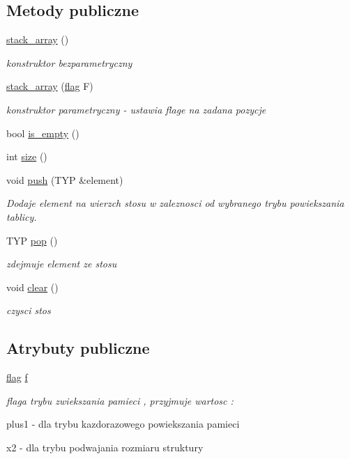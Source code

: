 \subsection*{\-Metody publiczne}
\begin{DoxyCompactItemize}
\item 
\hyperlink{classstack__array_a430ec07ba59152bdb618039ae5f74482}{stack\-\_\-array} ()
\begin{DoxyCompactList}\small\item\em konstruktor bezparametryczny \end{DoxyCompactList}\item 
\hyperlink{classstack__array_ad6ac30696a594fc1f4b58cc94facad9f}{stack\-\_\-array} (\hyperlink{stos_8hh_a7847560c748814fd3070e9149a9578bd}{flag} \-F)
\begin{DoxyCompactList}\small\item\em konstruktor parametryczny -\/ ustawia flage na zadana pozycje \end{DoxyCompactList}\item 
bool \hyperlink{classstack__array_a653b67eb0566e9481e3525dd2f2bc519}{is\-\_\-empty} ()
\item 
int \hyperlink{classstack__array_a26ee4c653f299d3fe03b443f6180d745}{size} ()
\item 
void \hyperlink{classstack__array_a2f48529c5e88d82f5da2b27c945e1b0e}{push} (\-T\-Y\-P \&element)
\begin{DoxyCompactList}\small\item\em \-Dodaje element na wierzch stosu w zaleznosci od wybranego trybu powiekszania tablicy. \end{DoxyCompactList}\item 
\-T\-Y\-P \hyperlink{classstack__array_ad2ce52b1a99f72d383b429dff262b9eb}{pop} ()
\begin{DoxyCompactList}\small\item\em zdejmuje element ze stosu \end{DoxyCompactList}\item 
void \hyperlink{classstack__array_ac55f6fe35d44781d918884e4c466d3ee}{clear} ()
\begin{DoxyCompactList}\small\item\em czysci stos \end{DoxyCompactList}\end{DoxyCompactItemize}
\subsection*{\-Atrybuty publiczne}
\begin{DoxyCompactItemize}
\item 
\hyperlink{stos_8hh_a7847560c748814fd3070e9149a9578bd}{flag} \hyperlink{classstack__array_a06357855e64616369e11f330191413ee}{f}
\begin{DoxyCompactList}\small\item\em flaga trybu zwiekszania pamieci , przyjmuje wartosc \-: \par
 plus1 -\/ dla trybu kazdorazowego powiekszania pamieci \par
 x2 -\/ dla trybu podwajania rozmiaru struktury \end{DoxyCompactList}\end{DoxyCompactItemize}
